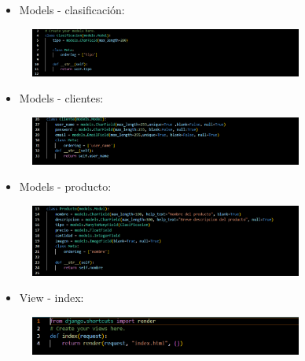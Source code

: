 \begin{itemize}	
	\item Models - clasificación:
\end{itemize}	
\begin{figure}[H]
	\centering
	\includegraphics[width=0.8\textwidth,keepaspectratio]{img/models-Clasificacion.png}
\end{figure}
\begin{itemize}	
	\item Models - clientes:
\end{itemize}	
\begin{figure}[H]
	\centering
	\includegraphics[width=0.8\textwidth,keepaspectratio]{img/models-Cliente.png}
\end{figure}
\begin{itemize}	
	\item Models - producto:
\end{itemize}	
\begin{figure}[H]
	\centering
	\includegraphics[width=0.8\textwidth,keepaspectratio]{img/models-Producto.png}
\end{figure}
\begin{itemize}	
	\item View - index:
\end{itemize}	
\begin{figure}[H]
	\centering
	\includegraphics[width=0.8\textwidth,keepaspectratio]{img/views-index.png}
\end{figure}
